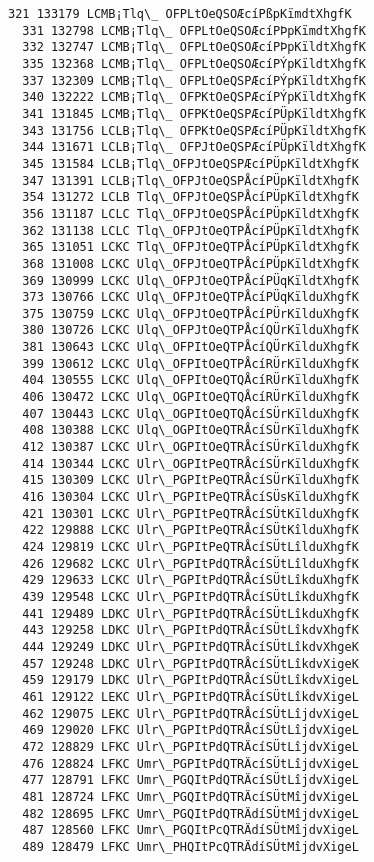 \documentclass[11pt]{article}
\begin{document}
\begin{Verbatim}[commandchars=\\\{\}]
  321 133179 LCMB¡Tlq\_ OFPLtOeQSOÆcíPßpKïmdtXhgfK
  331 132798 LCMB¡Tlq\_ OFPLtOeQSOÆcíPÞpKïmdtXhgfK
  332 132747 LCMB¡Tlq\_ OFPLtOeQSOÆcíPÞpKïldtXhgfK
  335 132368 LCMB¡Tlq\_ OFPLtOeQSOÆcíPÝpKïldtXhgfK
  337 132309 LCMB¡Tlq\_ OFPLtOeQSPÆcíPÝpKïldtXhgfK
  340 132222 LCMB¡Tlq\_ OFPKtOeQSPÆcíPÝpKïldtXhgfK
  341 131845 LCMB¡Tlq\_ OFPKtOeQSPÆcíPÜpKïldtXhgfK
  343 131756 LCLB¡Tlq\_ OFPKtOeQSPÆcíPÜpKïldtXhgfK
  344 131671 LCLB¡Tlq\_ OFPJtOeQSPÆcíPÜpKïldtXhgfK
  345 131584 LCLB¡Tlq\_OFPJtOeQSPÆcíPÜpKïldtXhgfK
  347 131391 LCLB¡Tlq\_OFPJtOeQSPÅcíPÜpKïldtXhgfK
  354 131272 LCLB Tlq\_OFPJtOeQSPÅcíPÜpKïldtXhgfK
  356 131187 LCLC Tlq\_OFPJtOeQSPÅcíPÜpKïldtXhgfK
  362 131138 LCLC Tlq\_OFPJtOeQTPÅcíPÜpKïldtXhgfK
  365 131051 LCKC Tlq\_OFPJtOeQTPÅcíPÜpKïldtXhgfK
  368 131008 LCKC Ulq\_OFPJtOeQTPÅcíPÜpKïldtXhgfK
  369 130999 LCKC Ulq\_OFPJtOeQTPÅcíPÜqKïldtXhgfK
  373 130766 LCKC Ulq\_OFPJtOeQTPÅcíPÜqKïlduXhgfK
  375 130759 LCKC Ulq\_OFPJtOeQTPÅcíPÜrKïlduXhgfK
  380 130726 LCKC Ulq\_OFPJtOeQTPÅcíQÜrKïlduXhgfK
  381 130643 LCKC Ulq\_OFPItOeQTPÅcíQÜrKïlduXhgfK
  399 130612 LCKC Ulq\_OFPItOeQTPÅcíRÜrKïlduXhgfK
  404 130555 LCKC Ulq\_OFPItOeQTQÅcíRÜrKïlduXhgfK
  406 130472 LCKC Ulq\_OGPItOeQTQÅcíRÜrKïlduXhgfK
  407 130443 LCKC Ulq\_OGPItOeQTQÅcíSÜrKïlduXhgfK
  408 130388 LCKC Ulq\_OGPItOeQTRÅcíSÜrKïlduXhgfK
  412 130387 LCKC Ulr\_OGPItOeQTRÅcíSÜrKïlduXhgfK
  414 130344 LCKC Ulr\_OGPItPeQTRÅcíSÜrKïlduXhgfK
  415 130309 LCKC Ulr\_PGPItPeQTRÅcíSÜrKïlduXhgfK
  416 130304 LCKC Ulr\_PGPItPeQTRÅcíSÜsKïlduXhgfK
  421 130301 LCKC Ulr\_PGPItPeQTRÅcíSÜtKïlduXhgfK
  422 129888 LCKC Ulr\_PGPItPeQTRÅcíSÜtKîlduXhgfK
  424 129819 LCKC Ulr\_PGPItPeQTRÅcíSÜtLîlduXhgfK
  426 129682 LCKC Ulr\_PGPItPdQTRÅcíSÜtLîlduXhgfK
  429 129633 LCKC Ulr\_PGPItPdQTRÅcíSÜtLîkduXhgfK
  439 129548 LCKC Ulr\_PGPItPdQTRÅcíSÜtLîkduXhgfK
  441 129489 LDKC Ulr\_PGPItPdQTRÅcíSÜtLîkduXhgfK
  443 129258 LDKC Ulr\_PGPItPdQTRÅcíSÜtLîkdvXhgfK
  444 129249 LDKC Ulr\_PGPItPdQTRÅcíSÜtLîkdvXhgeK
  457 129248 LDKC Ulr\_PGPItPdQTRÅcíSÜtLîkdvXigeK
  459 129179 LDKC Ulr\_PGPItPdQTRÅcíSÜtLîkdvXigeL
  461 129122 LEKC Ulr\_PGPItPdQTRÅcíSÜtLîkdvXigeL
  462 129075 LEKC Ulr\_PGPItPdQTRÅcíSÜtLîjdvXigeL
  469 129020 LFKC Ulr\_PGPItPdQTRÅcíSÜtLîjdvXigeL
  472 128829 LFKC Ulr\_PGPItPdQTRÄcíSÜtLîjdvXigeL
  476 128824 LFKC Umr\_PGPItPdQTRÄcíSÜtLîjdvXigeL
  477 128791 LFKC Umr\_PGQItPdQTRÄcíSÜtLîjdvXigeL
  481 128724 LFKC Umr\_PGQItPdQTRÄcíSÜtMîjdvXigeL
  482 128695 LFKC Umr\_PGQItPdQTRÄdíSÜtMîjdvXigeL
  487 128560 LFKC Umr\_PGQItPcQTRÄdíSÜtMîjdvXigeL
  489 128479 LFKC Umr\_PHQItPcQTRÄdíSÜtMîjdvXigeL

\end{Verbatim}
\end{document}
